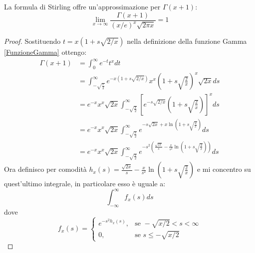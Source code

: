 \begin{theorem}\label{StirlingGamma}
	La formula di Stirling offre un'approssimazione per $\Gamma(x+1)$:
	\begin{equation*}
		\lim_{x\to\infty}\frac{\Gamma(x+1)}{(x/e)^x\sqrt{2\pi x}}=1
	\end{equation*}
\end{theorem}
\begin{proof}
	Sostituendo $t=x(1+s\sqrt{2/x})$ nella definizione della funzione Gamma \cref{FunzioneGamma} ottengo:
	\begin{equation} \label{ga:QuasiStirling}
	\begin{split}
		\Gamma(x+1) & = \int_0^\infty{e^{-t}t^{x}dt}\\
					& = \int_{-\sqrt{\frac{x}{2}}}^\infty{ e^{-x(1+s\sqrt{2/x})} x^x\left(1+s\sqrt{\frac{2}{x}}\right)^x \sqrt{2x} ds}\\
					& = e^{-x}x^x\sqrt{2x}\int_{-\sqrt{\frac{x}{2}}}^\infty{ \left[e^{-s\sqrt{2/x}} \left(1+s\sqrt{\frac{2}{x}}\right)\right]^x ds}\\
					& = e^{-x}x^x\sqrt{2x}\int_{-\sqrt{\frac{x}{2}}}^\infty{ e^{-s\sqrt{2x}+x\ln\left(1+s\sqrt{\frac{2}{x}}\right)} ds}\\
					& = e^{-x}x^x\sqrt{2x}\int_{-\sqrt{\frac{x}{2}}}^\infty{ e^{-s^2\left(\frac{\sqrt{2x}}{s}-\frac{x}{s^2}\ln\left(1+s\sqrt{\frac{2}{x}}\right)\right)} ds}
	\end{split}
	\end{equation}
	Ora definisco per comodità $h_x(s)=\frac{\sqrt{2x}}{s}-\frac{x}{s^2}\ln\left(1+s\sqrt{\frac{2}{x}}\right)$ 
	e mi concentro su quest'ultimo integrale, in particolare esso è uguale a:
	\begin{equation*}
		\int_{-\infty}^\infty{ f_x(s) ds}
	\end{equation*}
	dove 
	\begin{equation*}
		f_x(s)=\begin{cases}
				e^{-s^2h_x(s)}, & \mbox{se } -\sqrt{x/2}<s<\infty \\
							 0, & \mbox{se } s\le -\sqrt{x/2}
	\end{cases}
	\end{equation*}
	

\end{proof}
